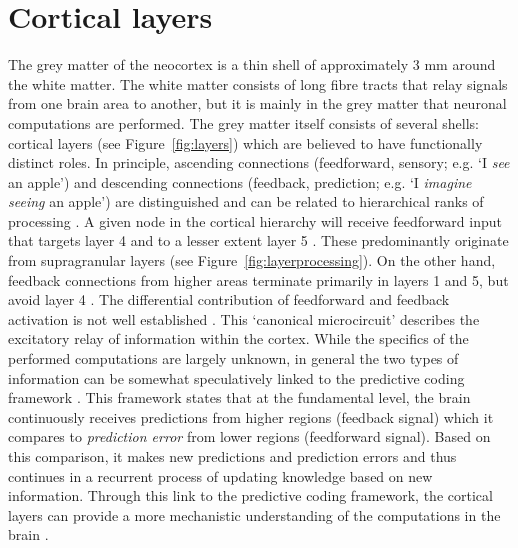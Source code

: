 \section*{Cortical layers}
The grey matter of the neocortex is a thin shell of approximately 3 mm \cite{Zilles1990} around the white matter. The white matter consists of long fibre tracts that relay signals from one brain area to another, but it is mainly in the grey matter that neuronal computations are performed. The grey matter itself consists of several shells: cortical layers (see Figure~\ref{fig:layers}) which are believed to have functionally distinct roles.
In principle, ascending connections (feedforward, sensory; e.g. `I \emph{see} an apple') and descending connections (feedback, prediction; e.g. `I \emph{imagine seeing} an apple') are distinguished \cite{Rockland1979} and can be related to hierarchical ranks of processing \cite{Barone2000}. A given node in the cortical hierarchy will receive feedforward input that targets layer 4 and to a lesser extent layer 5 \cite{Constantinople2013}. These predominantly originate from supragranular layers (see Figure~\ref{fig:layerprocessing}). On the other hand, feedback connections from higher areas terminate primarily in layers 1 and 5, but avoid layer 4 \cite{Anderson2009}. The differential contribution of feedforward and feedback activation is not well established \cite{Shipp2013}. This `canonical microcircuit' describes the excitatory relay of information within the cortex. While the specifics of the performed computations are largely unknown, in general the two types of information can be somewhat speculatively linked to the predictive coding framework \cite{Friston2010}. This framework states that at the fundamental level, the brain continuously receives predictions from higher regions (feedback signal) which it compares to \emph{prediction error} from lower regions (feedforward signal). Based on this comparison, it makes new predictions and prediction errors and thus continues in a recurrent process of updating knowledge based on new information. Through this link to the predictive coding framework, the cortical layers can provide a more mechanistic understanding of the computations in the brain \cite{Shipp2016}.


